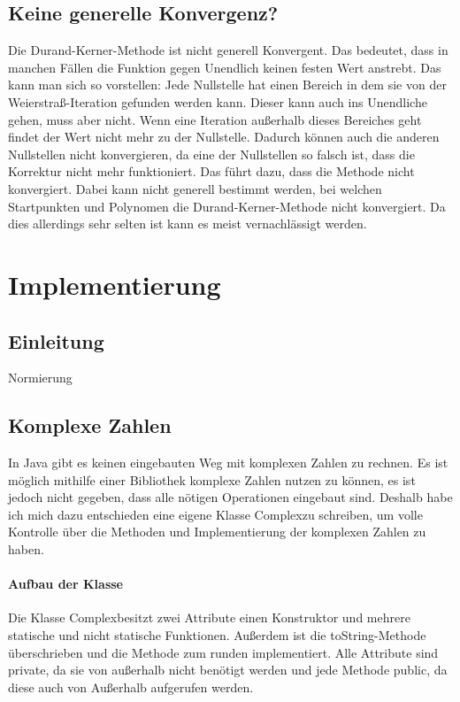 \documentclass[12pt]{article}
\begin{document}
\subsection{Keine generelle Konvergenz?}
Die Durand-Kerner-Methode ist nicht generell Konvergent. Das bedeutet, dass in manchen Fällen die Funktion gegen Unendlich keinen festen Wert anstrebt. Das kann man sich so vorstellen: Jede Nullstelle hat einen Bereich in dem sie von der Weierstraß-Iteration gefunden werden kann. Dieser kann auch ins Unendliche gehen, muss aber nicht. Wenn eine Iteration außerhalb dieses Bereiches geht findet der Wert nicht mehr zu der Nullstelle. Dadurch können auch die anderen Nullstellen nicht konvergieren, da eine der Nullstellen so falsch ist, dass die Korrektur nicht mehr funktioniert. Das führt dazu, dass die Methode nicht konvergiert. Dabei kann nicht generell bestimmt werden, bei welchen Startpunkten und Polynomen die Durand-Kerner-Methode nicht konvergiert. Da dies allerdings sehr selten ist kann es meist vernachlässigt werden.

\section{Implementierung}
\subsection{Einleitung}
Normierung
\subsection{Komplexe Zahlen}
In Java gibt es keinen eingebauten Weg mit komplexen Zahlen zu rechnen. Es ist möglich mithilfe einer Bibliothek komplexe Zahlen nutzen zu können, es ist jedoch nicht gegeben, dass alle nötigen Operationen eingebaut sind. Deshalb habe ich mich dazu entschieden eine eigene Klasse \glqq Complex\grqq zu schreiben, um volle Kontrolle über die Methoden und Implementierung der komplexen Zahlen zu haben.

\paragraph{Aufbau der Klasse}
Die Klasse \glqq Complex\glqq\space besitzt zwei Attribute einen Konstruktor und mehrere statische und nicht statische Funktionen. Außerdem ist die \glqq toString\glqq-Methode überschrieben und die Methode zum runden implementiert. Alle Attribute sind \glqq private\grqq, da sie von außerhalb nicht benötigt werden und jede Methode \glqq public\glqq, da diese auch von Außerhalb aufgerufen werden.
\end{document}
